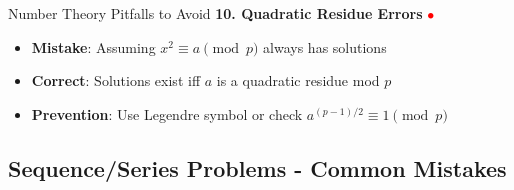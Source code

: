 \documentclass{article}
\begin{document}
\begin{trapbox}{Number Theory Pitfalls to Avoid}
\textbf{10. Quadratic Residue Errors} \textcolor{red}{$\bullet$}
\begin{itemize}[nosep]
\item \textbf{Mistake}: Assuming $x^2 \equiv a \pmod p$ always has solutions
\item \textbf{Correct}: Solutions exist iff $a$ is a quadratic residue mod $p$
\item \textbf{Prevention}: Use Legendre symbol or check $a^{(p-1)/2} \equiv 1 \pmod p$
\end{itemize}
\end{trapbox}

\subsection{Sequence/Series Problems - Common Mistakes}
\end{document}
